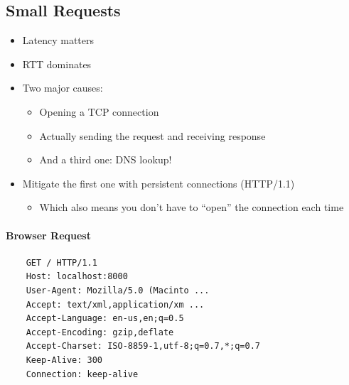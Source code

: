 \subsection{Small Requests}
\begin{itemize}[nosep]
    \item Latency matters
    \item RTT dominates
    \item Two major causes:
          \begin{itemize}[nosep]
              \item Opening a TCP connection
              \item Actually sending the request and receiving response
              \item And a third one: DNS lookup!
          \end{itemize}
    \item Mitigate the first one with persistent connections (HTTP/1.1)
          \begin{itemize}[nosep]
              \item Which also means you don't have to ``open'' the connection each time
          \end{itemize}
\end{itemize}

\paragraph{Browser Request}
\begin{verbatim}
    GET / HTTP/1.1
    Host: localhost:8000
    User-Agent: Mozilla/5.0 (Macinto ...
    Accept: text/xml,application/xm ...
    Accept-Language: en-us,en;q=0.5
    Accept-Encoding: gzip,deflate
    Accept-Charset: ISO-8859-1,utf-8;q=0.7,*;q=0.7
    Keep-Alive: 300
    Connection: keep-alive
\end{verbatim}

